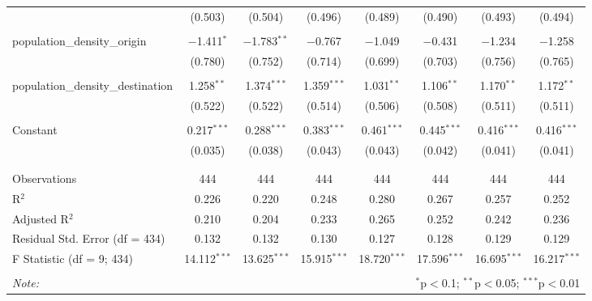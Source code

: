 \begin{table}[!htbp]
\begin{tabular}{@{\extracolsep{5pt}}lccccccc}
  & (0.503) & (0.504) & (0.496) & (0.489) & (0.490) & (0.493) & (0.494) \\ 
  & & & & & & & \\ 
 population\_density\_origin & $-$1.411$^{*}$ & $-$1.783$^{**}$ & $-$0.767 & $-$1.049 & $-$0.431 & $-$1.234 & $-$1.258 \\ 
  & (0.780) & (0.752) & (0.714) & (0.699) & (0.703) & (0.756) & (0.765) \\ 
  & & & & & & & \\ 
 population\_density\_destination & 1.258$^{**}$ & 1.374$^{***}$ & 1.359$^{***}$ & 1.031$^{**}$ & 1.106$^{**}$ & 1.170$^{**}$ & 1.172$^{**}$ \\ 
  & (0.522) & (0.522) & (0.514) & (0.506) & (0.508) & (0.511) & (0.511) \\ 
  & & & & & & & \\ 
 Constant & 0.217$^{***}$ & 0.288$^{***}$ & 0.383$^{***}$ & 0.461$^{***}$ & 0.445$^{***}$ & 0.416$^{***}$ & 0.416$^{***}$ \\ 
  & (0.035) & (0.038) & (0.043) & (0.043) & (0.042) & (0.041) & (0.041) \\ 
  & & & & & & & \\ 
\hline \\[-1.8ex] 
Observations & 444 & 444 & 444 & 444 & 444 & 444 & 444 \\ 
R$^{2}$ & 0.226 & 0.220 & 0.248 & 0.280 & 0.267 & 0.257 & 0.252 \\ 
Adjusted R$^{2}$ & 0.210 & 0.204 & 0.233 & 0.265 & 0.252 & 0.242 & 0.236 \\ 
Residual Std. Error (df = 434) & 0.132 & 0.132 & 0.130 & 0.127 & 0.128 & 0.129 & 0.129 \\ 
F Statistic (df = 9; 434) & 14.112$^{***}$ & 13.625$^{***}$ & 15.915$^{***}$ & 18.720$^{***}$ & 17.596$^{***}$ & 16.695$^{***}$ & 16.217$^{***}$ \\ 
\hline 
\hline \\[-1.8ex] 
\textit{Note:}  & \multicolumn{7}{r}{$^{*}$p$<$0.1; $^{**}$p$<$0.05; $^{***}$p$<$0.01} \\ 
\end{tabular} 
\end{table} 
